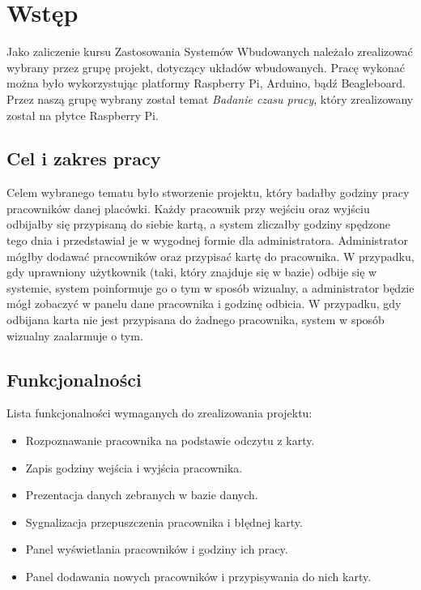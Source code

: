 \chapter{Wstęp}

Jako zaliczenie kursu Zastosowania Systemów Wbudowanych należało zrealizować wybrany przez grupę projekt, dotyczący układów wbudowanych. Pracę wykonać można było wykorzystując platformy Raspberry Pi, Arduino, bądź Beagleboard. Przez naszą grupę wybrany został temat \emph{Badanie czasu pracy}, który zrealizowany został na płytce Raspberry Pi.

\section{Cel i zakres pracy}

Celem wybranego tematu było stworzenie projektu, który badałby godziny pracy pracowników danej placówki. Każdy pracownik przy wejściu oraz wyjściu odbijałby się przypisaną do siebie kartą, a system zliczałby godziny spędzone tego dnia i przedstawiał je w wygodnej formie dla administratora. Administrator mógłby dodawać pracowników oraz przypisać kartę do pracownika. W przypadku, gdy uprawniony użytkownik (taki, który znajduje się w bazie) odbije się w systemie, system poinformuje go o tym w sposób wizualny, a administrator będzie mógł zobaczyć w panelu dane pracownika i godzinę odbicia. W przypadku, gdy odbijana karta nie jest przypisana do żadnego pracownika, system w sposób wizualny zaalarmuje o tym.

\section{Funkcjonalności}

Lista funkcjonalności wymaganych do zrealizowania projektu:

\begin{itemize}
  \item Rozpoznawanie pracownika na podstawie odczytu z karty.
  \item Zapis godziny wejścia i wyjścia pracownika.
  \item Prezentacja danych zebranych w bazie danych.
  \item Sygnalizacja przepuszczenia pracownika i błędnej karty.
  \item Panel wyświetlania pracowników i godziny ich pracy.
  \item Panel dodawania nowych pracowników i przypisywania do nich karty.
\end{itemize}

